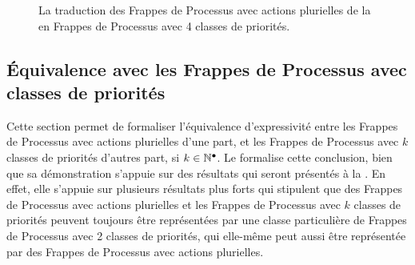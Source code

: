 \begin{example}
  \begin{figure}[ht]
  \begin{center}
  \caption{%
    La traduction des Frappes de Processus avec actions plurielles
    de la  en Frappes de Processus avec 4 classes de priorités.
  }
  \end{center}
  \end{figure}
\end{example}



\subsection{Équivalence avec les Frappes de Processus avec classes de priorités}

Cette section permet de formaliser l'équivalence d'expressivité entre les Frappes de Processus
avec actions plurielles d'une part, et les Frappes de Processus avec $k$ classes de priorités
d'autres part, si $k \in \mathbb{N}^\bullet$.
Le  formalise cette conclusion,
bien que sa démonstration s'appuie sur des résultats qui seront
présentés à la .
En effet, elle s'appuie sur plusieurs résultats plus forts qui stipulent que des
Frappes de Processus avec actions plurielles
et les Frappes de Processus avec $k$ classes de priorités
peuvent toujours être représentées
par une classe particulière de Frappes de Processus avec 2 classes de priorités,
qui elle-même peut aussi être représentée par des
Frappes de Processus avec actions plurielles.

